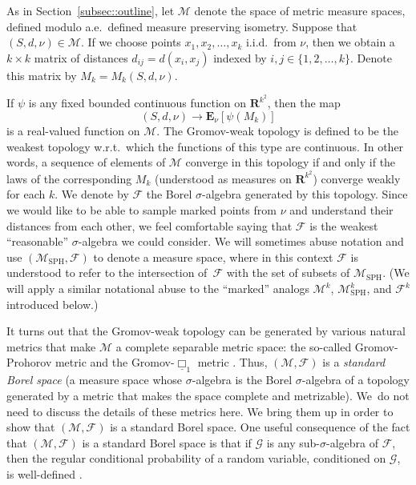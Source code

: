 \documentclass[10pt]{amsart}
\let\mathcal\mathscr
\theoremstyle{plain}
\numberwithin{theorem}{section}
\theoremstyle{definition}
\newcommand{\CG}{{\mathcal G}}
\newcommand\gmsspace{{\mathcal M}_{\mathrm{SPH}}}
\newcommand\mmspace{{\mathcal M}}
\newcommand\mmsigma{{\mathcal F}}
\newcommand \E {{\mathbf E}}
\newcommand{\R}{\mathbf{R}}
\begin{document}
As in Section~\ref{subsec::outline}, let $\mmspace$ denote the space of metric measure spaces, defined modulo a.e.\ defined measure preserving isometry. Suppose that $(S, d, \nu)\in \mmspace$. If we choose points $x_1, x_2, \ldots, x_k$ i.i.d.\ from $\nu$, then we obtain a $k \times k$ matrix of distances $d_{ij} = d(x_i, x_j)$ indexed by $i,j \in \{1,2,\ldots,k\}$. Denote this matrix by $M_k= M_k(S,d,\nu)$.

If $\psi$ is any fixed bounded continuous function on $\R^{k^2}$, then the map
\[
(S,d,\nu) \to \E_\nu [\psi(M_k)]
\]
is a real-valued function on $\mmspace$. The Gromov-weak topology is defined to be the weakest topology w.r.t.\ which the functions of this type are continuous. In other words, a sequence of elements of $\mmspace$ converge in this topology if and only if the laws of the corresponding $M_k$ (understood as measures on $\R^{k^2}$) converge weakly for each $k$. We denote by $\mmsigma$ the Borel $\sigma$-algebra generated by this topology. Since we would like to be able to sample marked points from $\nu$ and understand their distances from each other, we feel comfortable saying that $\mmsigma$ is the weakest ``reasonable'' $\sigma$-algebra we could consider. We will sometimes abuse notation and use $(\gmsspace, \mmsigma)$ to denote a measure space, where in this context $\mmsigma$ is understood to refer to the intersection of~$\mmsigma$ with the set of subsets of $\gmsspace$. (We will apply a similar notational abuse to the ``marked'' analogs $\mmspace^k$, $\gmsspace^k$, and $\mmsigma^k$ introduced below.)

It turns out that the Gromov-weak topology can be generated by various natural metrics that make $\mmspace$ a complete separable metric space: the so-called Gromov-Prohorov metric and the Gromov-$\underline \Box_1$ metric \cite{grevenpfaffelhuberwinter, gromovprohorovandgromovbox}. Thus, $(\mmspace, \mmsigma)$ is a \emph{standard Borel space} (\ie a measure space whose $\sigma$-algebra is the Borel $\sigma$-algebra of a topology generated by a metric that makes the space complete and metrizable). We~do not need to discuss the details of these metrics here. We bring them up in order to show that $(\mmspace, \mmsigma)$ is a standard Borel space. One useful consequence of the fact that $(\mmspace, \mmsigma)$ is a standard Borel space is that if $\CG$ is any sub-$\sigma$-algebra of $\mmsigma$, then the regular conditional probability of a random variable, conditioned on $\CG$, is well-defined \cite[Chap.\,5.1.3]{durrettprobtext}.
\end{document}
